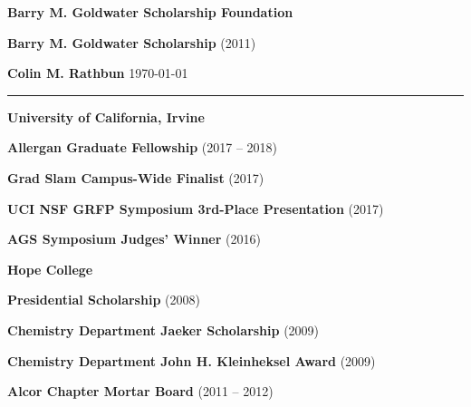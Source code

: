 \documentclass[10pt,letterpaper,courier]{article}
\newcommand{\makeheading}[1]%
        {\hspace*{-\marginparsep minus \marginparwidth}%
         \begin{minipage}[t]{\textwidth+\marginparwidth+\marginparsep}%
                {{\huge \bf \sf #1} \hfill \today}\\[-0.15\baselineskip]%
                 \rule{\columnwidth}{1pt}%
         \end{minipage}}
\newenvironment{innerlist}[1][\enskip\textbullet]%
        {\begin{compactenum}[#1]}{\end{compactenum}}
\newcommand{\blankline}{\quad\pagebreak[2]}
\begin{document}
\textbf{Barry M. Goldwater Scholarship Foundation}
\begin{innerlist}
\item {\bf Barry M. Goldwater Scholarship} (2011)
\end{innerlist}

\newpage\makeheading{Colin M. Rathbun} %

\vspace{.2in}

\textbf{University of California, Irvine}
\begin{innerlist}
\item {\bf Allergan Graduate Fellowship} (2017 -- 2018)
\item {\bf Grad Slam Campus-Wide Finalist} (2017)
\item {\bf UCI NSF GRFP Symposium 3rd-Place Presentation} (2017)
\item {\bf AGS Symposium Judges' Winner} (2016)
\end{innerlist}

\blankline

\textbf{Hope College}
\begin{innerlist}
\item {\bf Presidential Scholarship} (2008)
\item {\bf Chemistry Department Jaeker Scholarship} (2009)
\item {\bf Chemistry Department John H. Kleinheksel Award} (2009)
\item {\bf Alcor Chapter Mortar Board} (2011 -- 2012)
\end{innerlist}

\blankline %
\vspace{-.125in}


\blankline %
\end{document}
